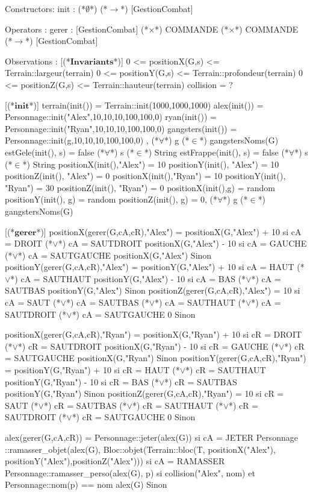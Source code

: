 \documentclass[a4paper, 11pt]{report}
\newcommand{\specB}[1]{\textbf{#1}}
\begin{document}
\begin{Spe}
Constructors:
      init : (*$\emptyset$*) (*$\rightarrow$*) [GestionCombat]
      
Operators :
      gerer : [GestionCombat] (*$\times$*) COMMANDE (*$\times$*) COMMANDE (*$\rightarrow$*) [GestionCombat]

Observations : 
      [(*$\specB{Invariants}$*)]
      	0 <= positionX(G,s) <= Terrain::largeur(terrain)
      	0 <= positionY(G,s) <= Terrain::profondeur(terrain)
      	0 <= positionZ(G,s) <= Terrain::hauteur(terrain)
      	collision = ?
            
      [(*$\specB{init}$*)]
	terrain(init()) = Terrain::init(1000,1000,1000)
	alex(init()) = Personnage::init("Alex",10,10,10,100,100,0)
	ryan(init()) = Personnage::init("Ryan",10,10,10,100,100,0)
	gangsters(init()) = {Personnage::init(g,10,10,10,100,100,0) , (*$\forall$*) g (*$\in$*) gangstersNoms(G)}
	estGele(init(), s) = false (*$\forall$*) s (*$\in$*) String 
	estFrappe(init(), s) = false (*$\forall$*) s (*$\in$*) String
	positionX(init(),"Alex") = 10
	positionY(init(), "Alex") = 10
	positionZ(init(), "Alex") = 0
	positionX(init(),"Ryan") = 10
	positionY(init(), "Ryan") = 30
	positionZ(init(), "Ryan") = 0
	positionX(init(),g) = random
	positionY(init(), g) = random
	positionZ(init(), g) = 0, (*$\forall$*) g (*$\in$*) gangstersNoms(G)

            
	 [(*$\specB{gerer}$*)]
	 positionX(gerer(G,cA,cR),"Alex") = 
	 	positionX(G,"Alex") + 10 si cA = DROIT (*$\lor$*) cA = SAUTDROIT
	 	positionX(G,"Alex") - 10 si cA = GAUCHE (*$\lor$*) cA = SAUTGAUCHE
	 	positionX(G,"Alex") Sinon
	 positionY(gerer(G,cA,cR),"Alex") = 
	 	positionY(G,"Alex") + 10 si cA = HAUT (*$\lor$*) cA = SAUTHAUT
	 	positionY(G,"Alex") - 10 si cA = BAS (*$\lor$*) cA = SAUTBAS
	 	positionY(G,"Alex") Sinon
	 positionZ(gerer(G,cA,cR),"Alex") = 
	 	10 si cA = SAUT (*$\lor$*) cA = SAUTBAS (*$\lor$*) cA = SAUTHAUT (*$\lor$*) cA = SAUTDROIT (*$\lor$*) cA = SAUTGAUCHE
		0 Sinon
		
	positionX(gerer(G,cA,cR),"Ryan") = 
	 	positionX(G,"Ryan") + 10 si cR = DROIT (*$\lor$*) cR = SAUTDROIT
	 	positionX(G,"Ryan") - 10 si cR = GAUCHE (*$\lor$*) cR = SAUTGAUCHE
	 	positionX(G,"Ryan") Sinon
	 positionY(gerer(G,cA,cR),"Ryan") = 
	 	positionY(G,"Ryan") + 10 si cR = HAUT (*$\lor$*) cR = SAUTHAUT
	 	positionY(G,"Ryan") - 10 si cR = BAS (*$\lor$*) cR = SAUTBAS
	 	positionY(G,"Ryan") Sinon
	 positionZ(gerer(G,cA,cR),"Ryan") = 
	 	10 si cR = SAUT (*$\lor$*) cR = SAUTBAS (*$\lor$*) cR = SAUTHAUT (*$\lor$*) cR = SAUTDROIT (*$\lor$*) cR = SAUTGAUCHE
		0 Sinon
		
	alex(gerer(G,cA,cR)) = 
		Personnage::jeter(alex(G)) si cA = JETER
		Personnage ::ramasser_objet(alex(G), Bloc::objet(Terrain::bloc(T, positionX("Alex"), positionY("Alex"),positionZ("Alex"))) si cA = RAMASSER
		Personnage::ramasser_perso(alex(G), p) si collision("Alex", nom) et Personnage::nom(p) == nom
		alex(G) Sinon
		
		


\end{Spe}
\end{document}
